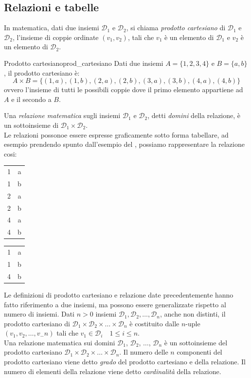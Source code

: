 \documentclass[12pt]{report}
\newcommand{\namerefl}[1]{%
	\bgroup
	\let\nmu\MakeLowercase
	\nameref{#1}\egroup}
\newcommand{\nmu}{}
\begin{document}
		\subsection{Relazioni e tabelle}
		In matematica, dati due insiemi $\mathcal{D}_1$ e $\mathcal{D}_2$, si chiama \textit{prodotto cartesiano} di $\mathcal{D}_1$ e $\mathcal{D}_2$, l'insieme di coppie ordinate $(v_1, v_2)$, tali che $v_1$ è un elemento di $\mathcal{D}_1$ e $v_2$ è un elemento di $\mathcal{D}_2$.
		\begin{example}{\nmu Prodotto cartesiano}{prod_cartesiano}
			Dati due insiemi $A = \{1, 2, 3, 4\}$ e $B = \{a, b\}$, il prodotto cartesiano è:
			\[
			A \times B = \{(1, a), (1, b), (2, a), (2, b), (3, a), (3, b), (4, a), (4, b)\}
			\]
			ovvero l'insieme di tutti le possibili coppie dove il primo elemento appartiene ad $A$ e il secondo a $B$.
		\end{example}
		Una \textit{relazione matematica} sugli insiemi $\mathcal{D}_1$ e $\mathcal{D}_2$, detti \textit{domini} della relazione, è un sottoinsieme di $\mathcal{D}_1 \times \mathcal{D}_2$. \\
		Le relazioni possonoe essere espresse graficamente sotto forma tabellare, ad esempio prendendo spunto dall'esempio del \namerefl{exa:prod_cartesiano}, possiamo rappresentare la relazione cosi: \\
		\begin{center}
			\begin{tabular}{|c|c|}
			\hline
			1 & a \\
			1 & b \\
			2 & a \\
			2 & b \\
			4 & a \\
			4 & b \\
			\hline
		\end{tabular}
		\hspace{2cm}
		\begin{tabular}{|c|c|}
			\hline
			1 & a \\
			1 & b \\
			4 & b \\
			\hline
		\end{tabular}
		\end{center}
	Le definizioni di prodotto cartesiano e relazione date precedentemente hanno fatto riferimento a due insiemi, ma possono essere generalizzate rispetto al numero di insiemi. Dati $n > 0$ insiemi $\mathcal{D}_1, \mathcal{D}_2, \dots, \mathcal{D}_n$, anche non distinti, il prodotto cartesiano di $\mathcal{D}_1 \times \mathcal{D}_2 \times \dots \times \mathcal{D}_n$ è costituito dalle $n$-uple $(v_1, v_2, \dots, v_-n)$ tali che $v_1 \in \mathcal{D}_i \quad 1 \leq i \leq n$. \\
	Una relazione matematica sui domini $\mathcal{D}_1$, $\mathcal{D}_2$, $\dots$, $\mathcal{D}_n$ è un sottoinsieme del prodotto cartesiano $\mathcal{D}_1 \times \mathcal{D}_2 \times \dots \times \mathcal{D}_n$. Il numero delle $n$ componenti del prodotto cartesiano viene detto \textit{grado} del prodotto cartesiano e della relazione. Il numero di elementi della relazione viene detto \textit{cardinalità} della relazione.
\end{document}

